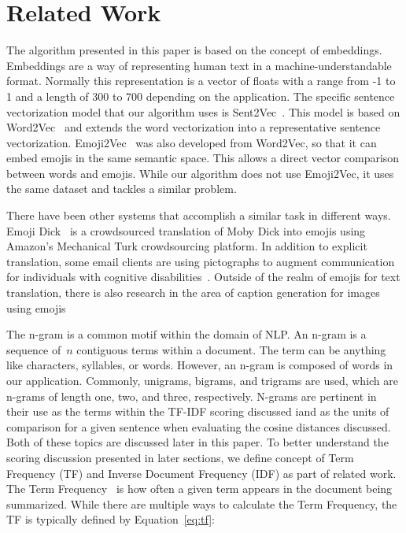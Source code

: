\documentclass{article}[10]
\begin{document}
\section{Related Work}

The algorithm presented in this paper is based on the concept of
embeddings. Embeddings are a way of representing human text in a
machine-understandable format. Normally this representation is a vector
of floats with a range from -1 to 1 and a length of 300 to 700 depending
on the application. The specific sentence vectorization model that our
algorithm uses is Sent2Vec~\cite{pg2017unsu}. This model is based on
Word2Vec~\cite{mikolov2013efficient} and extends the word vectorization into a
representative sentence vectorization. Emoji2Vec~\cite{Eisner_2016} was
also developed from Word2Vec, so that it can embed emojis in the same
semantic space. This allows a direct vector comparison between words and
emojis. While our algorithm does not use Emoji2Vec, it uses the same
dataset and tackles a similar problem.

There have been other systems that accomplish a similar task in
different ways. Emoji Dick~\cite{radford2016telephone} is a crowdsourced
translation of Moby Dick into emojis using Amazon's Mechanical Turk
crowdsourcing platform. In addition to explicit translation, some email
clients are using pictographs to augment communication for individuals
with cognitive disabilities~\cite{vandeghinste2017translating}. Outside of the realm
of emojis for text translation, there is also research in the area of
caption generation for images using emojis~\cite{mazoure-etal-2018-emojigan,cappallo2015image2emoji}

The n-gram is a common motif within the domain of NLP. An n-gram is a
sequence of~\(n\) contiguous terms within a document. The
term can be anything like characters, syllables, or words. However, an
n-gram is composed of words in our application. Commonly, unigrams,
bigrams, and trigrams are used, which are n-grams of length one, two,
and three, respectively. N-grams are pertinent in their use as the terms
within the TF-IDF scoring discussed iand as the units of comparison for
a given sentence when evaluating the cosine distances discussed. Both
of these topics are discussed later in this paper. To better understand
the scoring discussion presented in later sections, we define concept of
Term Frequency (TF) and Inverse Document Frequency (IDF) as part of
related work. The Term
Frequency~\cite{Leskovec} is how often a given term appears in the
document being summarized. While there are multiple ways to calculate
the Term Frequency, the TF is typically defined by Equation~\eqref{eq:tf}:
\end{document}
